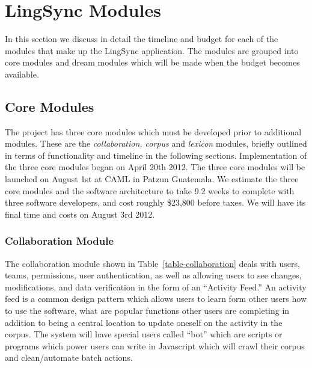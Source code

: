 \documentclass[12pt]{article}
\begin{document}
\appendix 

\section{LingSync Modules}

In this section we discuss in detail the timeline and budget for each of the modules that make up the LingSync application. The modules are grouped into core modules and dream modules which will be made when the budget becomes available. 

\label{sec:modules}
\subsection{Core Modules}

The project has three core modules which must be developed prior to additional modules. These are the {\it collaboration, corpus} and {\it lexicon} modules, briefly outlined in terms of functionality and timeline in the following sections.  Implementation of the three core modules began on April 20th 2012. The three core modules will be launched on August 1st at CAML in Patzun Guatemala. We estimate the three core modules and the software architecture to take 9.2 weeks to complete with three software developers,  and cost roughly \$23,800 before taxes. We will have its final time and costs on August 3rd 2012.


\newpage
\subsubsection{Collaboration Module}
The collaboration module shown in Table~\ref{table-collaboration}  deals with users, teams, permissions, user authentication,  as well as allowing users to see changes, modifications, and data verification in the form of an ``Activity Feed.'' An activity feed is a common design pattern which allows users to learn form other users how to use the software, what are popular functions other users are completing in addition to being a central location to update oneself on the activity in the corpus. The system will have special users called ``bot'' which are scripts or programs which power users can write in Javascript which will crawl their corpus and clean/automate batch actions.
\end{document}
